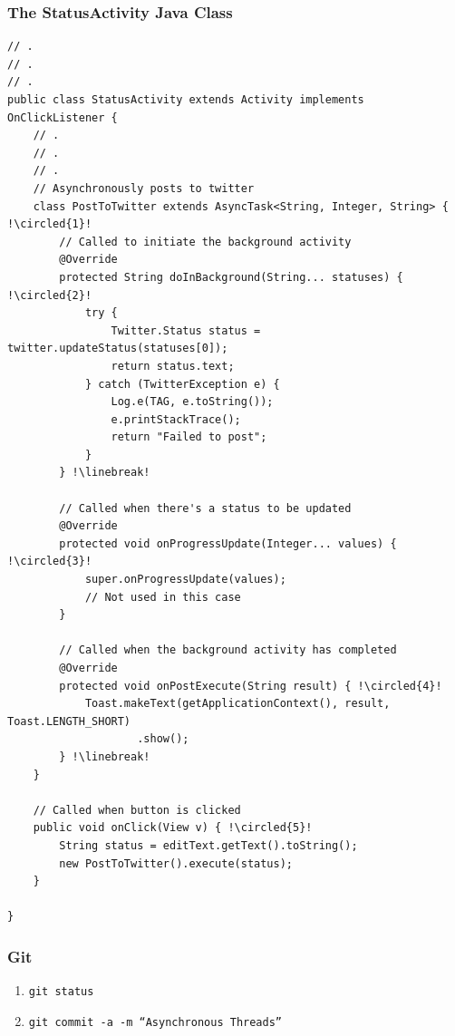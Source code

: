 


\begin{frame}
\frametitle{The StatusActivity Java Class}
\lstset{language=java, style=eclipse, breaklines=true, tabsize=2}
\begin{lstlisting}[caption=src/com/artemisa/yamba/StatusActivity.java, basicstyle=\tiny, escapechar=! ]
// .
// .
// .
public class StatusActivity extends Activity implements OnClickListener {
	// .
	// .
	// .
	// Asynchronously posts to twitter
	class PostToTwitter extends AsyncTask<String, Integer, String> { !\circled{1}!
		// Called to initiate the background activity
		@Override
		protected String doInBackground(String... statuses) { !\circled{2}!
			try {
				Twitter.Status status = twitter.updateStatus(statuses[0]);
				return status.text;
			} catch (TwitterException e) {
				Log.e(TAG, e.toString());
				e.printStackTrace();
				return "Failed to post";
			}
		} !\linebreak!

		// Called when there's a status to be updated
		@Override
		protected void onProgressUpdate(Integer... values) { !\circled{3}!
			super.onProgressUpdate(values);
			// Not used in this case
		}

		// Called when the background activity has completed
		@Override
		protected void onPostExecute(String result) { !\circled{4}!
			Toast.makeText(getApplicationContext(), result, Toast.LENGTH_SHORT)
					.show();
		} !\linebreak!
	}

	// Called when button is clicked
	public void onClick(View v) { !\circled{5}!
		String status = editText.getText().toString();
		new PostToTwitter().execute(status);
	} 

}
\end{lstlisting}
\end{frame}
\begin{frame}[fragile]
\frametitle{Git}
\begin{enumerate}
\item \texttt{git status}
\item \texttt{git commit -a -m ``Asynchronous Threads''}
\end{enumerate}

\end{frame}






